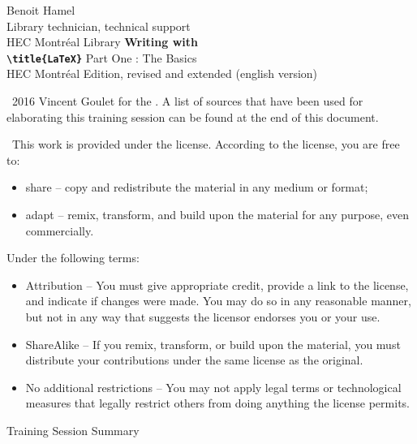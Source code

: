 \scriptsize

\begin{frame}
	Benoit Hamel \\
	Library technician, technical support \\
	HEC Montréal Library
	\vfill
	{
		\Huge\bfseries
		Writing with \\
		\texttt{\textbackslash title\{\textrm{\LaTeX}\}}
	}
	\vfill
	Part One : The Basics \\
	HEC Montréal Edition, revised and extended (english version)
\end{frame}

\begin{frame}
	\faCopyright\ 2016 Vincent Goulet for the 
	. A list of sources that have been used
	for elaborating this training session can be found at the end of this document.
	
	\faCreativeCommons\ This work is provided under the  
	 license. 
	According to the license, you are free to:
	
	\begin{itemize}
		\item share -- copy and redistribute the material in any medium or format;
		\item adapt -- remix, transform, and build upon the material
		for any purpose, even commercially.
	\end{itemize}

	Under the following terms:
	
	\begin{itemize}
		\item Attribution -- You must give appropriate credit, provide a link to the license, and indicate if changes were made. You may do so in any reasonable manner, but not in any way that suggests the licensor endorses you or your use.
		\item ShareAlike -- If you remix, transform, or build upon the material, you must distribute your contributions under the same license as the original.
		\item No additional restrictions -- You may not apply legal terms or technological measures that legally restrict others from doing anything the license permits.
	\end{itemize}
\end{frame}

\begin{frame}{Training Session Summary}
	\begin{columns}[onlytextwidth]
		\begin{column}{.49\textwidth}
			\tableofcontents[sections={1-3}]
		\end{column}
		\begin{column}{.49\textwidth}
			\tableofcontents[sections={4-8}]
		\end{column}
	\end{columns}
\end{frame}